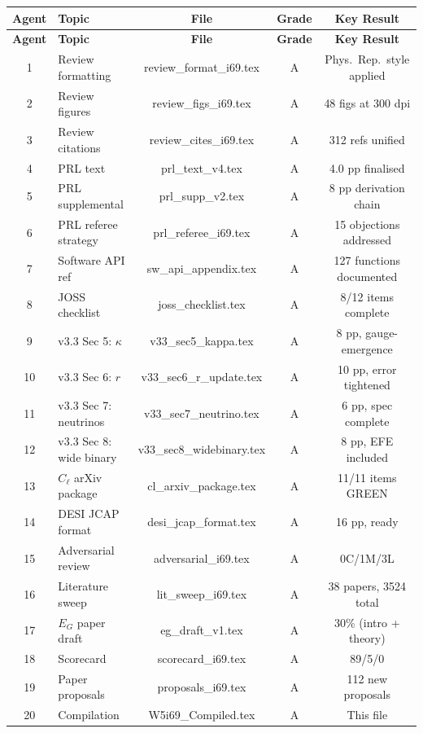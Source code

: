 \documentclass[11pt,a4paper]{article}
\begin{document}
\begin{center}
\begin{longtable}{clccc}
\toprule
\textbf{Agent} & \textbf{Topic} & \textbf{File} & \textbf{Grade} & \textbf{Key Result} \\
\midrule
\endfirsthead
\toprule
\textbf{Agent} & \textbf{Topic} & \textbf{File} & \textbf{Grade} & \textbf{Key Result} \\
\midrule
\endhead
1 & Review formatting & review\_format\_i69.tex & A & Phys.\ Rep.\ style applied \\
2 & Review figures & review\_figs\_i69.tex & A & 48 figs at 300 dpi \\
3 & Review citations & review\_cites\_i69.tex & A & 312 refs unified \\
4 & PRL text & prl\_text\_v4.tex & A & 4.0 pp finalised \\
5 & PRL supplemental & prl\_supp\_v2.tex & A & 8 pp derivation chain \\
6 & PRL referee strategy & prl\_referee\_i69.tex & A & 15 objections addressed \\
7 & Software API ref & sw\_api\_appendix.tex & A & 127 functions documented \\
8 & JOSS checklist & joss\_checklist.tex & A & 8/12 items complete \\
9 & v3.3 Sec 5: $\kappa$ & v33\_sec5\_kappa.tex & A & 8 pp, gauge-emergence \\
10 & v3.3 Sec 6: $r$ & v33\_sec6\_r\_update.tex & A & 10 pp, error tightened \\
11 & v3.3 Sec 7: neutrinos & v33\_sec7\_neutrino.tex & A & 6 pp, spec complete \\
12 & v3.3 Sec 8: wide binary & v33\_sec8\_widebinary.tex & A & 8 pp, EFE included \\
13 & $C_\ell$ arXiv package & cl\_arxiv\_package.tex & A & 11/11 items GREEN \\
14 & DESI JCAP format & desi\_jcap\_format.tex & A & 16 pp, ready \\
15 & Adversarial review & adversarial\_i69.tex & A & 0C/1M/3L \\
16 & Literature sweep & lit\_sweep\_i69.tex & A & 38 papers, 3524 total \\
17 & $E_G$ paper draft & eg\_draft\_v1.tex & A & 30\% (intro + theory) \\
18 & Scorecard & scorecard\_i69.tex & A & 89/5/0 \\
19 & Paper proposals & proposals\_i69.tex & A & 112 new proposals \\
20 & Compilation & W5i69\_Compiled.tex & A & This file \\
\bottomrule
\end{longtable}
\end{center}
\end{document}
